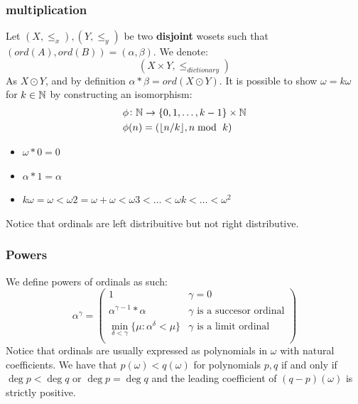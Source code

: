 \documentclass[11pt,a4paper]{article}
\begin{document}
	\subsubsection{multiplication}
	Let $(X,\le_x),(Y,\le_y)$ be two \textbf{disjoint} wosets such that 
	$(ord(A),ord(B)) = (\alpha,\beta)$. We denote:
	\[
		(X\times Y,\le_{dictionary})
	\]
	As $X \odot Y$, and by definition $\alpha * \beta = ord(X \odot Y)$.
	It is possible to show $\omega = k\omega$ for $k \in \mathbb{N}$ by constructing 
	an isomorphism:
	\begin{align*}
		&\phi \colon \mathbb{N} \rightarrow \{0, 1, \ldots, k-1\} \times \mathbb{N} \\
		&\phi(n)=(\lfloor{n/k}\rfloor,n \bmod \ k)
	\end{align*}

	\begin{itemize}
	\item $\omega*0=0$
	\item $\alpha*1=\alpha$
	\item $k\omega=\omega<\omega 2=\omega+\omega<\omega 3 
	<\ldots<\omega k<\ldots<\omega^2$
	\end{itemize}
	Notice that ordinals are left distribuitive but not right distributive.
	\subsubsection{Powers}
	We define powers of ordinals as such:
	\[
	\alpha^\gamma = 
	\begin{pmatrix}
		1 & \gamma=0\\
		\alpha^{\gamma-1}*\alpha & \gamma\text{ is a succesor ordinal}\\
		\min_{\delta<\gamma}\{\mu:\alpha^\delta<\mu\} & 
		\gamma\text{ is a limit ordinal}\\
	\end{pmatrix}
	\]
	Notice that ordinals are usually expressed as polynomials in $\omega$ with 
	natural coefficients. We have that $p(\omega) < q(\omega)$ for polynomials
	$p,q$ if and only if $\deg p < \deg q$ or $\deg p = \deg q$ and the
	leading coefficient of $(q - p)(\omega)$ is strictly positive.
\end{document}

